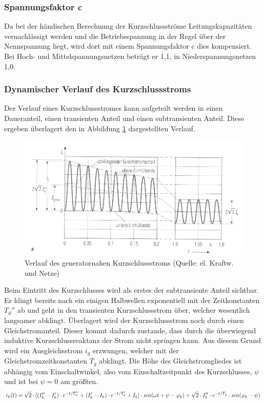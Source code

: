 \documentclass{scrartcl}
\begin{document}
\begin{onehalfspace}
\subsubsection{Spannungsfaktor c}
Da bei der händischen Berechnung der Kurzschlussströme Leitungskapazitäten vernachlässigt werden und die Betriebsspannung in der Regel über der Nennspannung liegt, wird dort mit einem Spannungsfaktor c dies kompensiert. Bei Hoch- und Mittelspannungsnetzen beträgt er 1,1, in Niederspannungsnetzen 1,0.

\subsubsection{Dynamischer Verlauf des Kurzschlussstroms}
Der Verlauf eines Kurzschlussstromes kann aufgeteilt werden in einen Daueranteil, einen transienten Anteil und einen subtransienten Anteil. Diese ergeben überlagert den in Abbildung \ref{kss-verlauf-nah} dargestellten Verlauf.

	\begin{figure}[H]
	\centering
	\includegraphics[scale=1.2]{img/kurzschlussstromverlauf-nah.jpg}
	\caption{Verlauf des generatornahen Kurzschlussstroms (Quelle: el. Kraftw. und Netze)}
	\label{kss-verlauf-nah}
	\end{figure}

Beim Eintritt des Kurzschlusses wird als erstes der subtransiente Anteil sichtbar. Er klingt bereits nach ein einigen Halbwellen exponentiell mit der Zeitkonstanten $T_d''$ ab und geht in den transienten Kurzschlussstrom über, welcher wesentlich langsamer abklingt. Überlagert wird der Kurzschlussstrom noch durch einen Gleichstromanteil. Dieser kommt dadurch zustande, dass durch die überwiegend induktive Kurzschlussreaktanz der Strom nicht \glqq springen\grqq{} kann. Aus diesem Grund wird ein Ausgleichsstrom $i_g$ erzwungen, welcher mit der Gleichstromzeitkonstanten $T_g$ abklingt. Die Höhe des Gleichstromgliedes ist abhängig vom Einschaltwinkel, also vom Einschaltzeitpunkt des Kurzschlusses, $\psi$ und ist bei $\psi = 0$ am größten.
\begin{equation}
i_k(t) = \sqrt{2} \cdot [(I_k'' - I_k') \cdot e^{-t/T_d''} + (I_k' - I_k) \cdot e^{-t/T_d'} + I_k] \cdot sin(\omega t + \psi - \varphi_k) + \sqrt{2} \cdot I_k'' \cdot e^{-t/T_g} \cdot sin( \varphi_k - \psi)  \\
\end{equation}



\end{onehalfspace}
\end{document}

